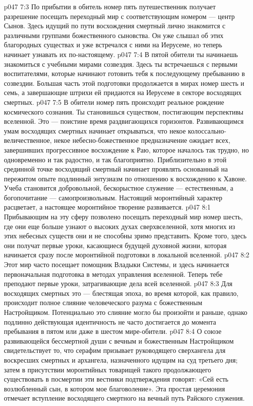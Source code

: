 \vs p047 7:3 По прибытии в обитель номер пять путешественник получает разрешение посещать переходный мир с соответствующим номером --- центр Сынов. Здесь идущий по пути восхождения смертный лично знакомится с различными группами божественного сыновства. Он уже слышал об этих благородных существах и уже встречался с ними на Иерусеме, но теперь начинает узнавать их по\hyp{}настоящему.
\vs p047 7:4 В пятой обители ты начинаешь знакомиться с учебными мирами созвездия. Здесь ты встречаешься с первыми воспитателями, которые начинают готовить тебя к последующему пребыванию в созвездии. Большая часть этой подготовки продолжается в мирах номер шесть и семь, а завершающие штрихи ей придаются на Иерусеме в секторе восходящих смертных.
\vs p047 7:5 В обители номер пять происходит реальное рождение космического сознания. Ты становишься существом, постигающим перспективы вселенной. Это --- поистине время раздвигающихся горизонтов. Развивающимся умам восходящих смертных начинает открываться, что некое колоссально\hyp{}величественное, некое небесно\hyp{}божественное предназначение ожидает всех, завершивших прогрессивное восхождение к Раю, которое началось так трудно, но одновременно и так радостно, и так благоприятно. Приблизительно в этой срединной точке восходящий смертный начинает проявлять основанный на пережитом опыте подлинный энтузиазм по отношению к восхождению к Хавоне. Учеба становится добровольной, бескорыстное служение --- естественным, а богопочитание --- самопроизвольным. Настоящий моронтийный характер расцветает, а настоящее моронтийное творение развивается.
\vs p047 8:1 Прибывающим на эту сферу позволено посещать переходный мир номер шесть, где они еще больше узнают о высоких духах сверхвселенной, хотя многих из этих небесных существ они и не способны зримо представить. Кроме того, здесь они получат первые уроки, касающиеся будущей духовной жизни, которая начинается сразу после моронтийной подготовки в локальной вселенной.
\vs p047 8:2 Этот мир часто посещает помощник Владыки Системы, и здесь начинается первоначальная подготовка в методах управления вселенной. Теперь тебе преподают первые уроки, затрагивающие дела всей вселенной.
\vs p047 8:3 \pc Для восходящих смертных это --- блестящая эпоха, во время которой, как правило, происходит полное слияние человеческого разума с божественным Настройщиком. Потенциально это слияние могло бы произойти и раньше, однако подлинно действующая идентичность не часто достигается до момента пребывания в пятом или даже в шестом мире\hyp{}обители.
\vs p047 8:4 \pc О союзе развивающейся бессмертной души с вечным и божественным Настройщиком свидетельствует то, что серафим призывает руководящего сверхангела для воскресших смертных и архангела, назначенного идущим на суд третьего дня; затем в присутствии моронтийных товарищей такого продолжающего существовать в посмертии эти вестники подтверждения говорят: «Сей есть возлюбленный сын, в котором мое благоволение». Эта простая церемония отмечает вступление восходящего смертного на вечный путь Райского служения.
